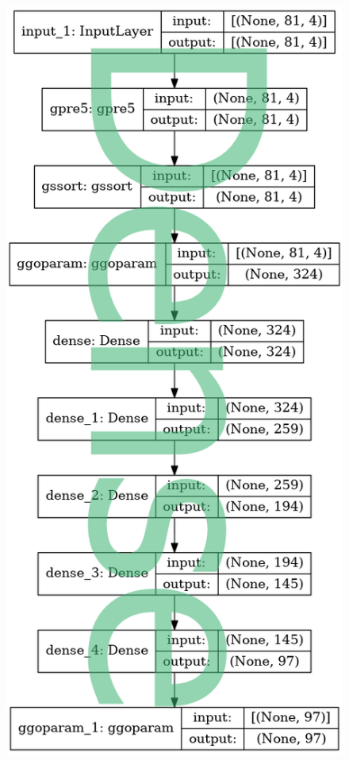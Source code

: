 \documentclass[hyperref={pdfpagelabels=false}]{beamer}
\begin{document}
\begin{frame}[label=]
\frametitle{}
\begin{columns}[c] %
\begin{column}{0.48\textwidth}%
\begin{figure}[H] 
  \centering
\includegraphics[height=0.9\textheight]{../imgs/xdenseencode.png}
\label{fig:xdenseencodepng}
  \end{figure}



\end{column}
\end{columns}
\end{frame}
\end{document}
